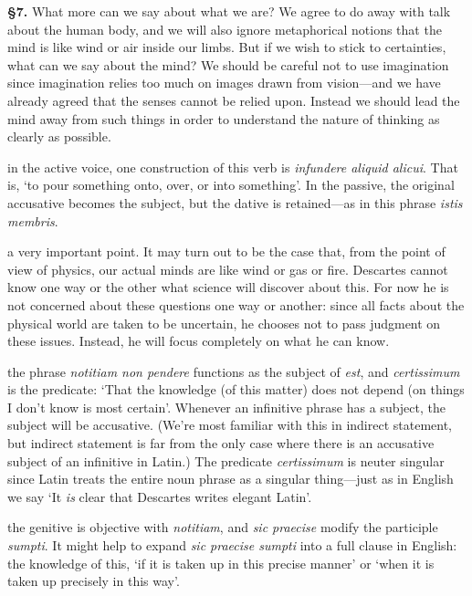 \prenotes

\textbf{§7.} What more can we say about what we are? We agree to do away with talk about the human body, and we will also ignore metaphorical notions that the mind is like wind or air inside our limbs. But if we wish to stick to certainties, what can we say about the mind? We should be careful not to use imagination since imagination relies too much on images drawn from vision---and we have already agreed that the senses cannot be relied upon. Instead we should lead the mind away from such things in order to understand the nature of thinking as clearly as possible.

 in the active voice, one construction of this verb is \textit{infundere aliquid alicui}. That is, `to pour something onto, over, or into something'. In the passive, the original accusative becomes the subject, but the dative is retained---as in this phrase \textit{istis membris}.

 a very important point. It may turn out to be the case that, from the point of view of physics, our actual minds are like wind or gas or fire. Descartes cannot know one way or the other what science will discover about this. For now he is not concerned about these questions one way or another: since all facts about the physical world are taken to be uncertain, he chooses not to pass judgment on these issues. Instead, he will focus completely on what he can know.

 the phrase \textit{notitiam non pendere} functions as the subject of \textit{est}, and \textit{certissimum} is the predicate: `That the knowledge (of this matter) does not depend (on things I don't know is most certain'. Whenever an infinitive phrase has a subject, the subject will be accusative. (We're most familiar with this in indirect statement, but indirect statement is far from the only case where there is an accusative subject of an infinitive in Latin.) The predicate \textit{certissimum} is neuter singular since Latin treats the entire noun phrase as a singular thing---just as in English we say `It \textit{is} clear that Descartes writes elegant Latin'.

 the genitive is objective with \textit{notitiam}, and \textit{sic praecise} modify the participle \textit{sumpti}. It might help to expand \textit{sic praecise sumpti} into a full clause in English: the knowledge of this, `if it is taken up in this precise manner' or `when it is taken up precisely in this way'.


